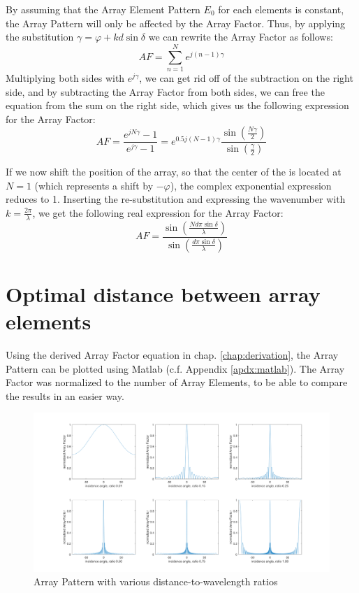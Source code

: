 By assuming that the Array Element Pattern $E_0$ for each elements is constant, the Array Pattern will only be affected by the Array Factor. Thus, by applying the substitution $\gamma = \varphi + kd\sin\delta$ we can rewrite the Array Factor as follows:
\begin{equation}
	AF = \sum_{n=1}^N e^{j(n-1)\gamma}
\end{equation}
Multiplying both sides with $e^{j\gamma}$, we can get rid off of the subtraction on the right side, and by subtracting the Array Factor from both sides, we can free the equation from the sum on the right side, which gives us the following expression for the Array Factor:
\begin{equation}
	AF = \frac{e^{jN\gamma} - 1}{e^{j\gamma} - 1} = e^{0.5j(N-1)\gamma} \frac{\sin(\frac{N\gamma}{2} )}{\sin(\frac{\gamma}{2} )}
\end{equation}

If we now shift the position of the array, so that the center of the is located at $N = 1$ (which represents a shift by $-\varphi$), the complex exponential expression reduces to 1. Inserting the re-substitution and expressing the wavenumber with $k = \frac{2\pi}{\lambda}$, we get the following real expression for the Array Factor:
\begin{equation}
	AF = \frac{\sin(\frac{Nd\pi\sin\delta}{\lambda})}{\sin(\frac{d\pi\sin\delta}{\lambda})}
	\label{eq:AF}
\end{equation}

\section{Optimal distance between array elements}
Using the derived Array Factor equation in chap. \ref{chap:derivation}, the Array Pattern can be plotted using Matlab (c.f. Appendix \ref{apdx:matlab}). The Array Factor was normalized to the number of Array Elements, to be able to compare the results in an easier way.

\begin{figure}[h!]
	\centering
	\includegraphics[width=\textwidth]{images/distanceVariation}
	\caption{Array Pattern with various distance-to-wavelength ratios}
	\label{fig:distance}
\end{figure} 

